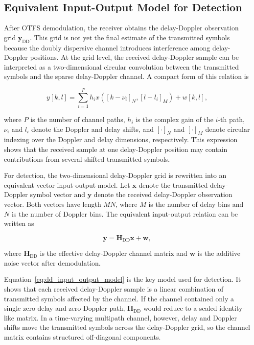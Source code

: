 \subsection{Equivalent Input-Output Model for Detection}

After OTFS demodulation, the receiver obtains the delay-Doppler observation grid \(\mathbf{y}_{\mathrm{DD}}\). This grid is not yet the final estimate of the transmitted symbols because the doubly dispersive channel introduces interference among delay-Doppler positions. At the grid level, the received delay-Doppler sample can be interpreted as a two-dimensional circular convolution between the transmitted symbols and the sparse delay-Doppler channel. A compact form of this relation is

\begin{equation}
    y[k,l]
    =
    \sum_{i=1}^{P}
    h_i
    x\!\left([\!k-\nu_i\!]_N,[\!l-l_i\!]_M\right)
    +
    w[k,l],
    \label{eq:dd_2d_convolution}
\end{equation}

where \(P\) is the number of channel paths, \(h_i\) is the complex gain of the \(i\)-th path, \(\nu_i\) and \(l_i\) denote the Doppler and delay shifts, and \([\cdot]_N\) and \([\cdot]_M\) denote circular indexing over the Doppler and delay dimensions, respectively. This expression shows that the received sample at one delay-Doppler position may contain contributions from several shifted transmitted symbols.

For detection, the two-dimensional delay-Doppler grid is rewritten into an equivalent vector input-output model. Let \(\mathbf{x}\) denote the transmitted delay-Doppler symbol vector and \(\mathbf{y}\) denote the received delay-Doppler observation vector. Both vectors have length \(MN\), where \(M\) is the number of delay bins and \(N\) is the number of Doppler bins. The equivalent input-output relation can be written as

\begin{equation}
    \mathbf{y}
    =
    \mathbf{H}_{\mathrm{DD}}\mathbf{x}
    +
    \mathbf{w},
    \label{eq:dd_input_output_model}
\end{equation}

where \(\mathbf{H}_{\mathrm{DD}}\) is the effective delay-Doppler channel matrix and \(\mathbf{w}\) is the additive noise vector after demodulation.

Equation~\eqref{eq:dd_input_output_model} is the key model used for detection. It shows that each received delay-Doppler sample is a linear combination of transmitted symbols affected by the channel. If the channel contained only a single zero-delay and zero-Doppler path, \(\mathbf{H}_{\mathrm{DD}}\) would reduce to a scaled identity-like matrix. In a time-varying multipath channel, however, delay and Doppler shifts move the transmitted symbols across the delay-Doppler grid, so the channel matrix contains structured off-diagonal components.

